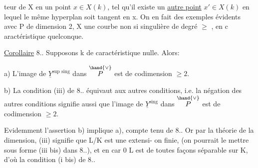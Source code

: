 
teur de X en un point $x\in X(k)$,  tel qu'il existe un \uline{autre point}
$x'\in X(k)$ en lequel le même hyperplan soit tangent en x. On en fait des
exemples évidents avec  P de dimension 2, X une courbe non si
singulière de degré $\geqslant$  , en c aractéristique quelconque. 

\uline{Corollaire} 8.. Supposons k de caractéristique nulle. Alors:

a) L'image de $\underline{Y}^{\text{sup sing}}$ dans $\overset{\hand{\vee}}{P}$ est de codimension $\geqslant 2$.

b) La condition (iii) de 8.. équivaut aux autres conditions, i.e.
la négation des autres conditions\hand{,}  signifie aussi que l'image de $\underline{Y}^{\text{sing}}$
dans $\overset{\hand{\vee}}{P}$ est de codimension $\geqslant 2$.

Evidemment l'assertion b) implique a), compte tenu de 8.. Or
par la théorie de la dimension, (iii) signifie que L/K est une extensi-%
on finie,  (on pourrait le mettre sous forme (iii bis) dans 8..),
et en car 0  L est de toutes façons séparable sur K, d'où
la condition (i bis) de 8..

